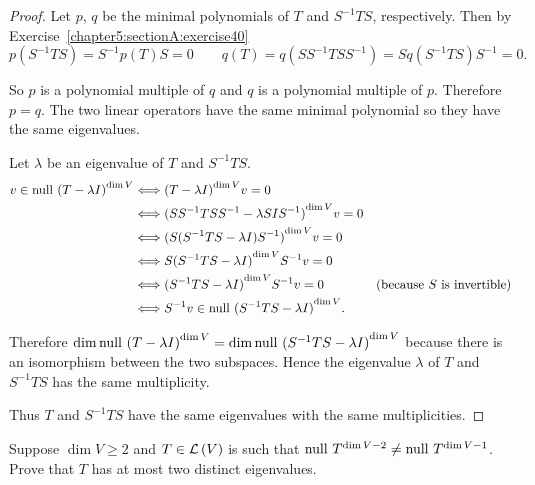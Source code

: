 \begin{proof}
    Let $p$, $q$ be the minimal polynomials of $T$ and $S^{-1}TS$, respectively. Then by Exercise~\ref{chapter5:sectionA:exercise40}
    \[
        p(S^{-1}TS) = S^{-1}p(T)S = 0\qquad q(T) = q(SS^{-1}TSS^{-1}) = Sq(S^{-1}TS)S^{-1} = 0.
    \]

    So $p$ is a polynomial multiple of $q$ and $q$ is a polynomial multiple of $p$. Therefore $p = q$. The two linear operators have the same minimal polynomial so they have the same eigenvalues.

    Let $\lambda$ be an eigenvalue of $T$ and $S^{-1}TS$.
    \begin{align*}
        v\in \operatorname{null}\,{{(T - \lambda I)}^{\dim V}} & \Longleftrightarrow {(T - \lambda I)}^{\dim V}v = 0                                                              \\
                                                 & \Longleftrightarrow {(SS^{-1}TSS^{-1} - \lambda SIS^{-1})}^{\dim V}v = 0                                         \\
                                                 & \Longleftrightarrow {{(S(S^{-1}TS - \lambda I)S^{-1})}^{\dim V}}v = 0                                            \\
                                                 & \Longleftrightarrow S{(S^{-1}TS - \lambda I)}^{\dim V}S^{-1}v = 0                                                \\
                                                 & \Longleftrightarrow {(S^{-1}TS - \lambda I)}^{\dim V}S^{-1}v = 0            & \text{(because $S$ is invertible)} \\
                                                 & \Longleftrightarrow S^{-1}v \in \operatorname{null}\,{{(S^{-1}TS - \lambda I)}^{\dim V}}.
    \end{align*}

    Therefore $\dim\operatorname{null}\,{{(T - \lambda I)}^{\dim V}} = \dim\operatorname{null}\,{{(S^{-1}TS - \lambda I)}^{\dim V}}$ because there is an isomorphism between the two subspaces. Hence the eigenvalue $\lambda$ of $T$ and $S^{-1}TS$ has the same multiplicity.

    Thus $T$ and $S^{-1}TS$ have the same eigenvalues with the same multiplicities.
\end{proof}
\newpage

\begin{exercise}\label{chapter8:sectionB:exercise4}
    Suppose $\dim V\geq 2$ and $T\in\mathcal{L}\left({V}\right)$ is such that $\operatorname{null}\,{T^{\dim V - 2}}\ne \operatorname{null}\,{T^{\dim V - 1}}$. Prove that $T$ has at most two distinct eigenvalues.
\end{exercise}

